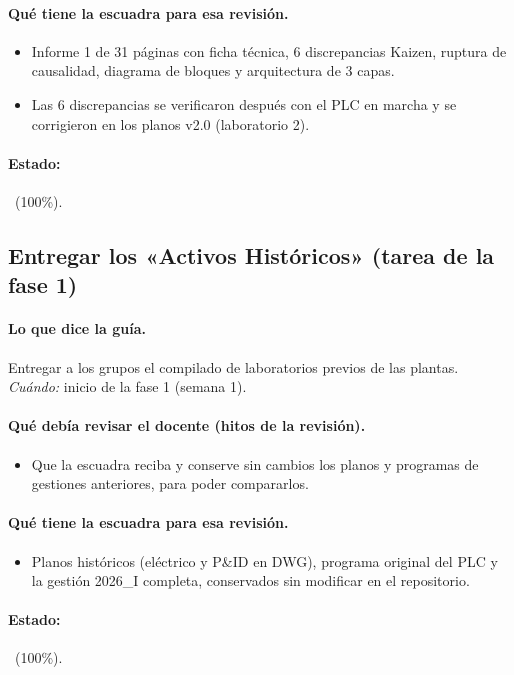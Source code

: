 \documentclass[a4paper,11pt]{article}
\begin{document}
\paragraph{Qué tiene la escuadra para esa revisión.}
\begin{itemize}
\item Informe 1 de 31 páginas con ficha técnica, 6 discrepancias Kaizen, ruptura de causalidad, diagrama de bloques y arquitectura de 3 capas.
\item Las 6 discrepancias se verificaron después con el PLC en marcha y se corrigieron en los planos v2.0 (laboratorio 2).
\end{itemize}
\paragraph{Estado:} \cumple~(100\%).
\subsection{Entregar los «Activos Históricos» (tarea de la fase 1)}
\paragraph{Lo que dice la guía.} Entregar a los grupos el compilado de laboratorios previos de las plantas. \textit{Cuándo:} inicio de la fase 1 (semana 1).
\paragraph{Qué debía revisar el docente (hitos de la revisión).}
\begin{itemize}
\item[$\square$] Que la escuadra reciba y conserve sin cambios los planos y programas de gestiones anteriores, para poder compararlos.
\end{itemize}
\paragraph{Qué tiene la escuadra para esa revisión.}
\begin{itemize}
\item Planos históricos (eléctrico y P\&ID en DWG), programa original del PLC y la gestión 2026\_I completa, conservados sin modificar en el repositorio.
\end{itemize}
\paragraph{Estado:} \cumple~(100\%).
\end{document}
